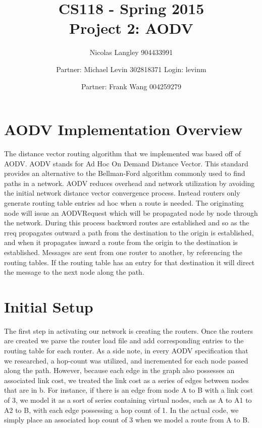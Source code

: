 \documentclass[12pt, titlepage]{article}
\begin{document}
\title{CS118 - Spring 2015 \\
Project 2: AODV}
\author{Nicolas Langley 904433991 \and Partner: Michael Levin 302818371 Login: levinm \and Partner: Frank Wang 004259279}

\maketitle
\section{AODV Implementation Overview}

The distance vector routing algorithm that we implemented was based off of AODV. AODV stands for Ad Hoc On Demand Distance Vector.
This standard provides an alternative to the Bellman-Ford algorithm commonly used to find paths in a network.
AODV reduces overhead and network utilization by avoiding the initial network distance vector convergence process.
Instead routers only generate routing table entries ad hoc when a route is needed.  The originating node will issue an AODVRequest which will be propagated node by node through the network. During this process backword routes are established and so as the rreq propagates outward a path from the destination to the origin is established, and when it propagates inward a route from the origin to the destination is established.  Messages are sent from one router to another, by referencing the routing tables.  If the routing table has an entry for that destination it will direct the message to the next node along the path.

\section{Initial Setup}
The first step in activating our network is creating the routers. Once the routers are created we parse the router load file and add corresponding entries to the routing table for each router. As a side note, in every AODV 
specification that we researched, a hop-count was utilized, and incremented for each node passed along the path. However, because each edge in the graph also possesses an associated link cost, we treated the link cost as a series of edges between nodes that are in b. For instance, if there is an edge from node A to B with a link cost of 3, we model it as a sort of series containing virtual nodes, such as A to A1 to A2 to B, with each edge possessing a hop count of 1. In the actual code, we simply place an associated hop count of 3 when we model a route from A to B. 
\end{document}
